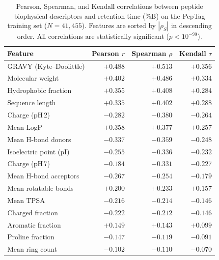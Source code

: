 \begin{table}[t]
\centering
\caption{Pearson, Spearman, and Kendall correlations between peptide biophysical
descriptors and retention time (\%B) on the PepTag training set ($N=41{,}455$).
Features are sorted by $|\rho_S|$ in descending order.
All correlations are statistically significant ($p < 10^{-90}$).}
\label{tab:biophysical_correlation}
\setlength{\tabcolsep}{8pt}
\begin{tabular}{lrrr}
\toprule
\textbf{Feature} & \textbf{Pearson $r$} & \textbf{Spearman $\rho$} & \textbf{Kendall $\tau$} \\
\midrule
GRAVY (Kyte--Doolittle)   & $+0.488$ & $+0.513$ & $+0.356$ \\
Molecular weight           & $+0.402$ & $+0.486$ & $+0.334$ \\
Hydrophobic fraction       & $+0.355$ & $+0.408$ & $+0.284$ \\
Sequence length            & $+0.335$ & $+0.402$ & $+0.288$ \\
Charge (pH\,2)             & $-0.282$ & $-0.380$ & $-0.264$ \\
Mean LogP                  & $+0.358$ & $+0.377$ & $+0.257$ \\
Mean H-bond donors         & $-0.337$ & $-0.359$ & $-0.248$ \\
Isoelectric point (pI)     & $-0.255$ & $-0.336$ & $-0.232$ \\
Charge (pH\,7)             & $-0.184$ & $-0.331$ & $-0.227$ \\
Mean H-bond acceptors      & $-0.267$ & $-0.254$ & $-0.179$ \\
Mean rotatable bonds       & $+0.200$ & $+0.233$ & $+0.157$ \\
Mean TPSA                  & $-0.216$ & $-0.214$ & $-0.146$ \\
Charged fraction           & $-0.222$ & $-0.212$ & $-0.146$ \\
Aromatic fraction          & $+0.149$ & $+0.143$ & $+0.099$ \\
Proline fraction           & $-0.147$ & $-0.119$ & $-0.091$ \\
Mean ring count            & $-0.102$ & $-0.110$ & $-0.070$ \\
\bottomrule
\end{tabular}
\end{table}
